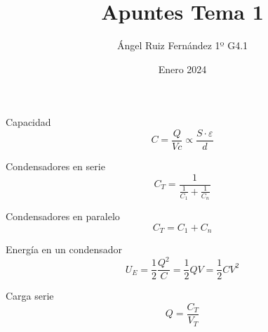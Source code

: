 \documentclass[12pt, letterpaper, twoside]{article}
\title{Apuntes Tema 1}
\author{Ángel Ruiz Fernández 1º G4.1}
\date{Enero 2024}
\begin{document}
	\maketitle

	Capacidad
	\begin{equation}
		C = \frac{Q}{Vc} \propto \frac{S \cdot \varepsilon}{d}
	\end{equation}

	Condensadores en serie
	\begin{equation}
		C_T = \frac{1}{\frac{1}{C_1} + \frac{1}{C_n}}
	\end{equation}

	Condensadores en paralelo
	\begin{equation}
		C_T = C_1 + C_n
	\end{equation}

	Energía en un condensador
	\begin{equation}
		U_E =  \frac{1}{2}\frac{Q^2}{C} = \frac{1}{2} QV = \frac{1}{2} CV^2
	\end{equation}

	Carga serie
	\begin{equation}
		Q = \frac{C_T}{V_T}
	\end{equation}
\end{document}
